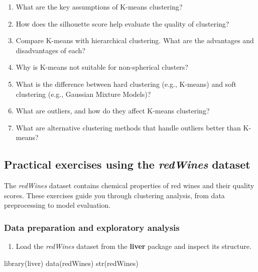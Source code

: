 \documentclass[
  11pt,
]{book}
\makeatletter
\newenvironment{Shaded}{}{}
\newcommand{\FunctionTok}[1]{#1}
\newcommand{\NormalTok}[1]{#1}
\providecommand{\tightlist}{%
  \setlength{\itemsep}{0pt}\setlength{\parskip}{0pt}}
\newenvironment{kframe}{%
\medskip{}
\setlength{\fboxsep}{.8em}
 \def\at@end@of@kframe{}%
 \ifinner\ifhmode%
  \def\at@end@of@kframe{\end{minipage}}%
  \begin{minipage}{\columnwidth}%
 \fi\fi%
 \def\FrameCommand##1{\hskip\@totalleftmargin \hskip-\fboxsep
 \colorbox{shadecolor}{##1}\hskip-\fboxsep
     \hskip-\linewidth \hskip-\@totalleftmargin \hskip\columnwidth}%
 \MakeFramed {\advance\hsize-\width
   \@totalleftmargin\z@ \linewidth\hsize
   \@setminipage}}%
 {\par\unskip\endMakeFramed%
 \at@end@of@kframe}
\renewenvironment{Shaded}{\begin{kframe}}{\end{kframe}}
\theoremstyle{definition}
\theoremstyle{definition}
\theoremstyle{definition}
\theoremstyle{definition}
\theoremstyle{remark}
\makeatother
\begin{document}
\begin{enumerate}
\item
  What are the key assumptions of K-means clustering?\\
\item
  How does the silhouette score help evaluate the quality of clustering?\\
\item
  Compare K-means with hierarchical clustering. What are the advantages and disadvantages of each?\\
\item
  Why is K-means not suitable for non-spherical clusters?\\
\item
  What is the difference between hard clustering (e.g., K-means) and soft clustering (e.g., Gaussian Mixture Models)?\\
\item
  What are outliers, and how do they affect K-means clustering?\\
\item
  What are alternative clustering methods that handle outliers better than K-means?
\end{enumerate}

\subsection*{\texorpdfstring{Practical exercises using the \emph{redWines} dataset}{Practical exercises using the redWines dataset}}\label{practical-exercises-using-the-redwines-dataset-1}


The \emph{redWines} dataset contains chemical properties of red wines and their quality scores. These exercises guide you through clustering analysis, from data preprocessing to model evaluation.

\subsubsection*{Data preparation and exploratory analysis}\label{data-preparation-and-exploratory-analysis}


\begin{enumerate}
\def\labelenumi{\arabic{enumi}.}
\setcounter{enumi}{20}
\tightlist
\item
  Load the \emph{redWines} dataset from the \textbf{liver} package and inspect its structure.\\
\end{enumerate}

\begin{Shaded}
\begin{Highlighting}[]
\FunctionTok{library}\NormalTok{(liver)}
\FunctionTok{data}\NormalTok{(redWines)}
\FunctionTok{str}\NormalTok{(redWines)}
\end{Highlighting}
\end{Shaded}
\end{document}
